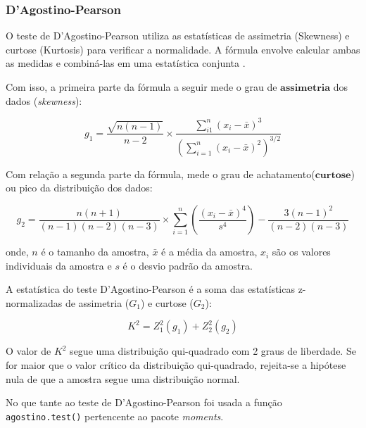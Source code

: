 \documentclass[a4paper,11pt]{article} %
\begin{document}
\subsubsection{D’Agostino-Pearson}

O teste de D'Agostino-Pearson utiliza as estatísticas de assimetria (Skewness) e curtose (Kurtosis) para verificar a normalidade. A fórmula envolve calcular ambas as medidas e combiná-las em uma estatística conjunta \cite{d1973tests}.

\vspace{0.5cm}

Com isso, a primeira parte da fórmula a seguir mede o grau de $\textbf{assimetria}$ dos dados (\textit{skewness}):

\begin{equation}
g_{1} = \frac{\sqrt{n(n-1)}}{n-2} \times \frac{\sum_{i1}^{n} (x_{i}-\bar{x})^{3}}{\left( \sum_{i=1}^{n} (x_{i}-\bar{x})^{2}\right)^{3/2}}
\end{equation}

Com relação a segunda parte da fórmula, mede o grau de achatamento($\textbf{curtose}$) ou pico da distribuição dos dados:

\begin{equation}
g_{2} = \frac{n(n+1)}{(n-1)(n-2)(n-3)} \times \sum_{i=1}^{n} \left(  \frac{(x_{i}-\bar{x})^{4}}{s^{4}} \right) - \frac{3(n-1)^{2}}{(n-2)(n-3)}
\end{equation}

onde, $n$ é o tamanho da amostra, $\bar{x}$ é a média da amostra, $x_{i}$ são os valores individuais da amostra e $s$ é o desvio padrão da amostra.

\vspace{0.5cm}

A estatística do teste  D'Agostino-Pearson é a soma das estatísticas z-normalizadas de assimetria ($G_{1}$) e curtose ($G_{2}$):

\begin{equation}
    K^{2} = Z_{1}^{2}(g_{1}) + Z_{2}^{2}(g_{2})
\end{equation}

O valor de $K^{2}$ segue uma distribuição qui-quadrado com 2 graus de liberdade. Se for maior que o valor crítico da distribuição qui-quadrado, rejeita-se a hipótese nula de que a amostra segue uma distribuição normal.

\vspace{0.5cm}

No que tante ao teste de D’Agostino-Pearson foi usada a função \texttt{agostino.test()} pertencente ao pacote \textit{moments}.\vskip0.3cm
\end{document}
